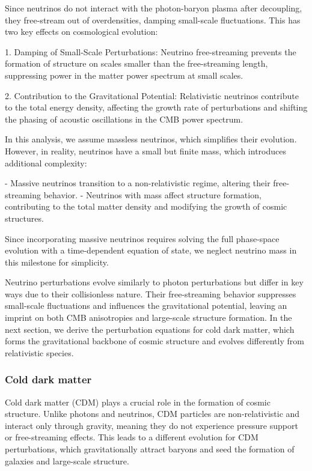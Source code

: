 \documentclass{aa}
\begin{document}
Since neutrinos do not interact with the photon-baryon plasma after decoupling, they free-stream out of overdensities, damping small-scale fluctuations. This has two key effects on cosmological evolution:

1. Damping of Small-Scale Perturbations:  
   Neutrino free-streaming prevents the formation of structure on scales smaller than the free-streaming length, suppressing power in the matter power spectrum at small scales.

2. Contribution to the Gravitational Potential:  
   Relativistic neutrinos contribute to the total energy density, affecting the growth rate of perturbations and shifting the phasing of acoustic oscillations in the CMB power spectrum.

In this analysis, we assume massless neutrinos, which simplifies their evolution. However, in reality, neutrinos have a small but finite mass, which introduces additional complexity:

- Massive neutrinos transition to a non-relativistic regime, altering their free-streaming behavior.
- Neutrinos with mass affect structure formation, contributing to the total matter density and modifying the growth of cosmic structures.

Since incorporating massive neutrinos requires solving the full phase-space evolution with a time-dependent equation of state, we neglect neutrino mass in this milestone for simplicity. 

Neutrino perturbations evolve similarly to photon perturbations but differ in key ways due to their collisionless nature. Their free-streaming behavior suppresses small-scale fluctuations and influences the gravitational potential, leaving an imprint on both CMB anisotropies and large-scale structure formation. In the next section, we derive the perturbation equations for cold dark matter, which forms the gravitational backbone of cosmic structure and evolves differently from relativistic species.
\color{black}







\subsubsection{Cold dark matter}
\color{Plum}
Cold dark matter (CDM) plays a crucial role in the formation of cosmic structure. Unlike photons and neutrinos, CDM particles are non-relativistic and interact only through gravity, meaning they do not experience pressure support or free-streaming effects. This leads to a different evolution for CDM perturbations, which gravitationally attract baryons and seed the formation of galaxies and large-scale structure.
\end{document}
